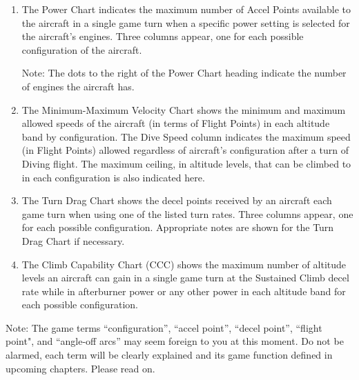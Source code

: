 \begin{enumerate}
    \item {} 
    The Power Chart indicates the maximum number of Accel Points available to the aircraft in a single game turn when a specific power setting is selected for the aircraft's engines. Three columns appear, one for each possible configuration of the aircraft. 

    Note: The dots to the right of the Power Chart heading indicate the number of engines the aircraft has.

    \item {} 
    The Minimum-Maximum Velocity Chart shows the minimum and maximum allowed speeds of the aircraft (in terms of Flight Points) in each altitude band by configuration. The Dive Speed column indicates the maximum speed (in Flight Points) allowed regardless of aircraft's configuration after a turn of Diving flight. The maximum ceiling, in altitude levels, that can be climbed to in each configuration is also indicated here.

    \item {} 
    The Turn Drag Chart shows the decel points received by an aircraft each game turn when using one of the listed turn rates. Three columns appear, one for each possible configuration. Appropriate notes are shown for the Turn Drag Chart if necessary.

    \item {} 
    The Climb Capability Chart (CCC) shows the maximum number of altitude levels an aircraft can gain in a single game turn at the Sustained Climb decel rate while in afterburner power or any other power in each altitude band for each possible configuration.

\end{enumerate}

Note: The game terms “configuration”, “accel point”, “decel point”, “flight point", and “angle-off arcs” may seem foreign to you at this moment. Do not be alarmed, each term will be clearly explained and its game function defined in upcoming chapters. Please read on.

